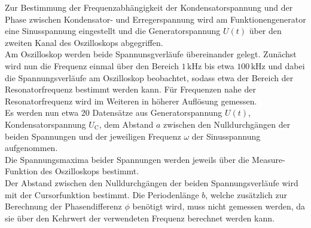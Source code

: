 Zur Bestimmung der Frequenzabhängigkeit der Kondensatorspannung und der Phase zwischen Kondensator- und Erregerspannung wird am Funktionengenerator eine Sinusspannung eingestellt und die Generatorspannung $U(t)$ über den zweiten Kanal des Oszilloskops abgegriffen.\\
Am Oszilloskop werden beide Spannunsgverläufe übereinander gelegt.
Zunächst wird nun die Frequenz einmal über den Bereich $1 \,\si{\kilo\Hz}$ bis etwa $100 \,\si{\kilo\Hz}$ und dabei die Spannungsverläufe am Oszilloskop beobachtet, sodass etwa der Bereich der Resonatorfrequenz bestimmt werden kann.
Für Frequenzen nahe der Resonatorfrequenz wird im Weiteren in höherer Auflösung gemessen.\\
Es werden nun etwa 20 Datensätze aus Generatorspannung $U(t)$, Kondensatorspannung $U_\text{C}$, dem Abstand $a$ zwischen den Nulldurchgängen der beiden Spannungen und der jeweiligen Frequenz $\omega$ der Sinusspannung aufgenommen.\\
Die Spannungsmaxima beider Spannungen werden jeweils über die Measure-Funktion des Oszilloskops bestimmt.\\
Der Abstand zwischen den Nulldurchgängen der beiden Spannungsverläufe wird mit der Cursorfunktion bestimmt.
Die Periodenlänge $b$, welche zusätzlich zur Berechnung der Phasendifferenz $\phi$ benötigt wird, muss nicht gemessen werden, da sie über den Kehrwert der verwendeten Frequenz berechnet werden kann.
